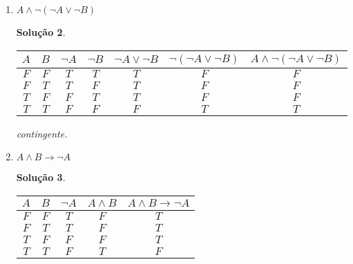 \documentclass[11pt,a4paper]{report}
\newtheorem*{Solucao}{Solu\c{c}\~ao}
\newcommand{\F}{$F$}
\newcommand{\T}{$T$}
\begin{document}
\begin{enumerate}
\begin{enumerate}
\begin{Solucao}
                    contingente.
                  \end{Solucao}

		\item $A\land\neg (\neg A\lor \neg B)$

                  \begin{Solucao}
                    \verb| |\\
                    \begin{tabular}{|c|c|c|c|c|c|c|}
                      \hline
                      $A$ & $B$ & $\neg A$ & $\neg B$ & $\neg A \lor
                      \neg B$ & $\neg (\neg A \lor \neg B) $ & $A
                      \land \neg (\neg A \lor \neg B)$ \\ \hline
                      \F & \F & \T & \T & \T & \F & \F \\
                      \F & \T & \T & \F & \T & \F & \F \\
                      \T & \F & \F & \T & \T & \F & \F \\
                      \T & \T & \F & \F & \F & \T & \T \\ \hline
                     \end{tabular}

                     contingente.
                  \end{Solucao}
		\item $A\land B\rightarrow\neg A$
                  \begin{Solucao}
                    \verb| |\\
                    \begin{tabular}{|c|c|c|c|c|}
                      \hline
                      $A$ & $B$ & $\neg A$ & $A\land B$ & $A \land B
                      \to \neg A$ \\ \hline
                      \F & \F & \T & \F & \T \\
                      \F & \T & \T & \F & \T \\
                      \T & \F & \F & \F & \T \\
                      \T & \T & \F & \T & \F \\ \hline
                     \end{tabular}


\end{Solucao}
\end{enumerate}
\end{enumerate}
\end{document}
